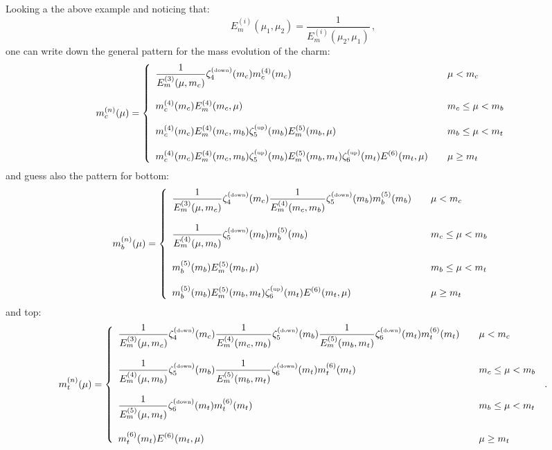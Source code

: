 \documentclass[10pt,a4paper]{article}
\begin{document}
Looking a the above example and noticing that:
\begin{equation}
E_m^{(i)}(\mu_1,\mu_2) = \frac1{E_m^{(i)}(\mu_2,\mu_1) }\,,
\end{equation}
one can write down the general pattern for the mass evolution of the charm:
\begin{equation}
m_c^{(n)}(\mu)=\left\{
\begin{array}{ll}
\displaystyle \frac{1}{E_m^{(3)}(\mu,m_c)}\zeta_4^{(\mbox{\tiny down})}(m_c)m_c^{(4)}(m_c)&\quad \mu<m_c\\
\\
\displaystyle m_c^{(4)}(m_c)E_m^{(4)}(m_c,\mu)&\quad m_c\leq\mu<m_b\\
\\
\displaystyle m_c^{(4)}(m_c)E_m^{(4)}(m_c,m_b)\zeta_5^{(\mbox{\tiny up})}(m_b)E_m^{(5)}(m_b,\mu)&\quad m_b\leq\mu<m_t\\
\\
\displaystyle m_c^{(4)}(m_c)E_m^{(4)}(m_c,m_b)\zeta_5^{(\mbox{\tiny up})}(m_b)E_m^{(5)}(m_b,m_t)\zeta_6^{(\mbox{\tiny up})}(m_t)E^{(6)}(m_t,\mu)&\quad\mu \geq m_t
\end{array}\right.
\end{equation}
and guess also the pattern for bottom:
\begin{equation}
m_b^{(n)}(\mu)=\left\{
\begin{array}{ll}
\displaystyle \frac{1}{E_m^{(3)}(\mu,m_c)}\zeta_4^{(\mbox{\tiny down})}(m_c)\frac{1}{E_m^{(4)}(m_c,m_b)}\zeta_5^{(\mbox{\tiny down})}(m_b)m_b^{(5)}(m_b)&\quad \mu<m_c\\
\\
\displaystyle \frac{1}{E_m^{(4)}(\mu,m_b)}\zeta_5^{(\mbox{\tiny down})}(m_b)m_b^{(5)}(m_b)&\quad m_c\leq\mu<m_b\\
\\
\displaystyle m_b^{(5)}(m_b)E_m^{(5)}(m_b,\mu)&\quad m_b\leq\mu<m_t\\
\\
\displaystyle m_b^{(5)}(m_b)E_m^{(5)}(m_b,m_t)\zeta_6^{(\mbox{\tiny up})}(m_t)E^{(6)}(m_t,\mu)&\quad\mu \geq m_t
\end{array}\right.
\end{equation}
and top:
\begin{equation}
m_t^{(n)}(\mu)=\left\{
\begin{array}{ll}
\displaystyle \frac{1}{E_m^{(3)}(\mu,m_c)}\zeta_4^{(\mbox{\tiny down})}(m_c)\frac{1}{E_m^{(4)}(m_c,m_b)}\zeta_5^{(\mbox{\tiny down})}(m_b)\frac{1}{E_m^{(5)}(m_b,m_t)}\zeta_6^{(\mbox{\tiny down})}(m_t)m_t^{(6)}(m_t)&\quad \mu<m_c\\
\\
\displaystyle \frac{1}{E_m^{(4)}(\mu,m_b)}\zeta_5^{(\mbox{\tiny down})}(m_b)\frac{1}{E_m^{(5)}(m_b,m_t)}\zeta_6^{(\mbox{\tiny down})}(m_t)m_t^{(6)}(m_t)&\quad m_c\leq\mu<m_b\\
\\
\displaystyle \frac{1}{E_m^{(5)}(\mu,m_t)}\zeta_6^{(\mbox{\tiny down})}(m_t)m_t^{(6)}(m_t)&\quad m_b\leq\mu<m_t\\
\\
\displaystyle m_t^{(6)}(m_t)E^{(6)}(m_t,\mu)&\quad\mu \geq m_t
\end{array}\right.\,.
\end{equation}
\end{document}
